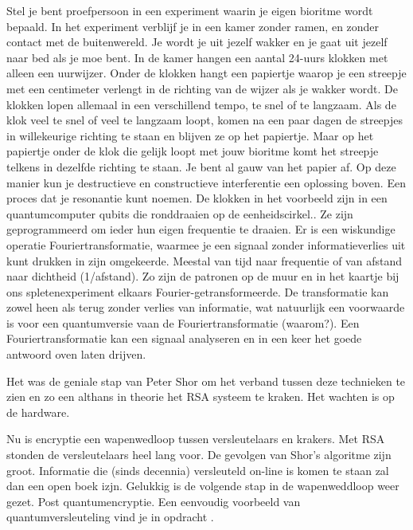 \documentclass[../main.tex]{subfiles}
\begin{document}
Stel je bent proefpersoon in een experiment waarin je eigen bioritme wordt bepaald. In het experiment verblijf je in een kamer zonder ramen, en zonder contact met de buitenwereld. Je wordt je uit jezelf wakker en je gaat uit jezelf naar bed als je moe bent. In de kamer hangen een aantal 24-uurs klokken met alleen een uurwijzer. Onder de klokken hangt een papiertje waarop je een streepje met een centimeter verlengt in de richting van de wijzer als je wakker wordt. De klokken lopen allemaal in een verschillend tempo, te snel of te langzaam. Als de klok veel te snel of veel te langzaam loopt, komen na een paar dagen de streepjes in willekeurige richting te staan en blijven ze op het papiertje. Maar op het papiertje onder de klok die gelijk loopt met jouw bioritme komt het streepje telkens in dezelfde richting te staan. Je bent al gauw van het papier af. Op deze manier kun je destructieve en constructieve interferentie een oplossing boven. Een proces dat je resonantie kunt noemen.
De klokken in het voorbeeld zijn in een quantumcomputer qubits die ronddraaien op de eenheidscirkel.. Ze zijn geprogrammeerd om ieder hun eigen frequentie te draaien. 
Er is een wiskundige operatie Fouriertransformatie, waarmee je een signaal zonder informatieverlies uit kunt drukken in zijn omgekeerde. Meestal van tijd naar frequentie of van afstand naar dichtheid (1/afstand). Zo zijn de patronen op de muur en in het kaartje bij ons spletenexperiment elkaars Fourier-getransformeerde. De transformatie kan zowel heen als terug zonder verlies van informatie, wat natuurlijk een voorwaarde is voor een quantumversie vaan de Fouriertransformatie (waarom?).
Een Fouriertransformatie kan een signaal analyseren en in een keer het goede antwoord oven laten drijven.

Het was de geniale stap van Peter Shor om het verband tussen deze technieken te zien en zo een althans in theorie het RSA systeem te kraken. Het wachten is op de hardware.

Nu is encryptie een wapenwedloop tussen versleutelaars en krakers. Met RSA stonden de versleutelaars heel lang voor. De gevolgen van Shor's algoritme zijn groot. Informatie die (sinds decennia) versleuteld on-line is komen te staan zal dan een open boek izjn. Gelukkig is de volgende stap in de wapenweddloop weer gezet. Post quantumencryptie. Een eenvoudig voorbeeld van quantumversleuteling vind je in opdracht .

\newcommand\klok[2][2]{%
\begin{tikzpicture}[scale=#1,line cap=round,line width=#1*3pt]
\filldraw [fill=yellow!20] (0,0) circle (2cm);
\foreach \angle / \label in
{0/6, 30/4, 60/2, 90/24, 120/22, 150/20, 180/18,
210/16, 240/14, 270/12, 300/10, 330/8}
{
\draw[line width=#1*1pt] (\angle:1.8cm) -- (\angle:2cm);
\draw (\angle:1.4cm) node[scale=#1]{\textsf{\label}};
}
\foreach \angle in {0,90,180,270}
\draw[line width=#1*2pt] (\angle:1.6cm) -- (\angle:2cm);
\node[draw=none,font=\tiny,text=red,scale=#1] at (0,.9cm) {Quantim};
\draw[rotate=90,line width=#1*2pt] (0,0) -- (-#2*15:0.7cm); %
\path [fill=black] (0,0) circle (3pt);
\path [fill=red] (0,0) circle (1.5pt);
%
\end{tikzpicture}%
}
\end{document}
